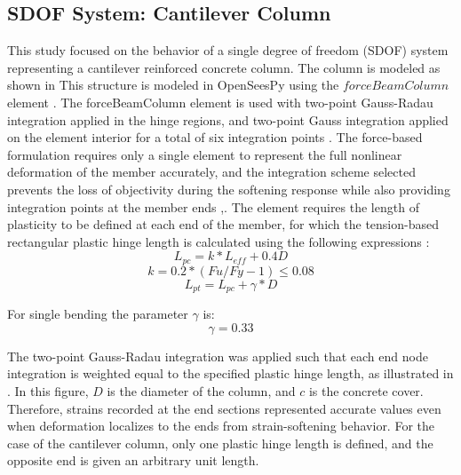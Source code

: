 \subsection{SDOF System: Cantilever Column}
This study focused on the behavior of a single degree of freedom (SDOF) system representing a cantilever reinforced concrete column. The column is modeled as shown in  This structure is modeled in OpenSeesPy \cite{McKenna2010}\cite{Zhu2018} using the $forceBeamColumn$ element \cite{Scott}. The forceBeamColumn element is used with two-point Gauss-Radau integration applied in the hinge regions, and two-point Gauss integration applied on the element interior for a total of six integration points \cite{Scott}. The force-based formulation requires only a single element to represent the full nonlinear deformation of the member accurately, and the integration scheme selected prevents the loss of objectivity during the softening response while also providing integration points at the member ends \cite{Calabrese2010},\cite{Scott}. The element requires the length of plasticity to be defined at each end of the member, for which the tension-based rectangular plastic hinge length is calculated using the following expressions \cite{Goodnight2013}:
\begin{equation}
    L_{pc}=k*L_{eff} + 0.4D
    \label{eq:LP_Comp}
\end{equation}
\begin{equation}
	k=0.2*(Fu/Fy - 1) \leqslant 0.08
	\label{eq:K_Lp}
\end{equation}
\begin{equation}
    L_{pt}=L_{pc}+\gamma*D
    \label{eq:LP_Tension}
\end{equation}

For single bending the parameter $\gamma$ is:
\begin{equation}
    \gamma=0.33
    \label{eq:Gamma_LPt}
\end{equation}

The two-point Gauss-Radau integration was applied such that each end node integration is weighted equal to the specified plastic hinge length, as illustrated in . In this figure, $D$ is the diameter of the column, and $c$ is the concrete cover. Therefore, strains recorded at the end sections represented accurate values even when deformation localizes to the ends from strain-softening behavior. For the case of the cantilever column, only one plastic hinge length is defined, and the opposite end is given an arbitrary unit length. 

